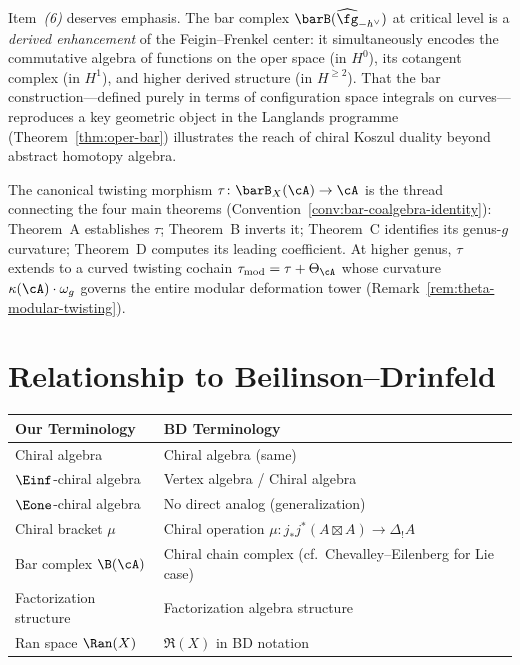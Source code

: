 \begin{remark}%
\label{rem:oper-langlands-concordance}
%
%
Item~\emph{(6)} deserves emphasis.  The bar complex
$\barB(\widehat{\fg}_{-h^\vee})$ at critical level is a
\emph{derived enhancement} of the Feigin--Frenkel center: it
simultaneously encodes the commutative algebra of functions on
the oper space (in $H^0$), its cotangent complex (in $H^1$),
and higher derived structure (in $H^{\geq 2}$).  That the
bar construction---defined purely in terms of configuration
space integrals on curves---reproduces a key geometric
object in the Langlands programme
(Theorem~\ref{thm:oper-bar}) illustrates the reach of
chiral Koszul duality beyond abstract homotopy algebra.
\end{remark}

\begin{remark}
\label{rem:tau-protagonist}
The canonical twisting morphism $\tau \colon \barB_X(\cA) \to \cA$
is the thread connecting the four main theorems
(Convention~\ref{conv:bar-coalgebra-identity}):
Theorem~A establishes $\tau$; Theorem~B inverts it;
Theorem~C identifies its genus-$g$ curvature; Theorem~D computes
its leading coefficient.
At higher genus, $\tau$ extends to a curved twisting cochain
$\tau_{\mathrm{mod}} = \tau + \Theta_\cA$
whose curvature $\kappa(\cA)\cdot\omega_g$ governs the entire
modular deformation tower
(Remark~\ref{rem:theta-modular-twisting}).
\end{remark}

\section{Relationship to Beilinson--Drinfeld}

\begin{tabular}{>{\raggedright\arraybackslash}p{}>{\raggedright\arraybackslash}p{}}
\textbf{Our Terminology} & \textbf{BD Terminology} \\
\hline
Chiral algebra & Chiral algebra (same) \\
$\Einf$-chiral algebra & Vertex algebra / Chiral algebra \\
$\Eone$-chiral algebra & No direct analog (generalization) \\
Chiral bracket $\mu$ & Chiral operation $\mu: j_* j^*(A \boxtimes A) \to \Delta_! A$ \\
Bar complex $\B(\cA)$ & Chiral chain complex (cf.\ Chevalley--Eilenberg for Lie case) \\
Factorization structure & Factorization algebra structure \\
Ran space $\Ran(X)$ & $\mathfrak{R}(X)$ in BD notation \\
\end{tabular}

